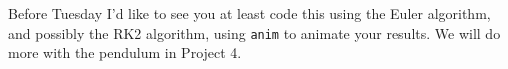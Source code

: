 \documentclass[12pt]{article}
\begin{document}
\begin{enumerate}
Before Tuesday I'd like to see you at least code this using the Euler algorithm, and possibly the RK2 algorithm, using {\tt anim} to animate your results. We will do more with the pendulum in Project 4.

%
%
%
%
%
%
%
%
%

\end{enumerate}
\end{document}
